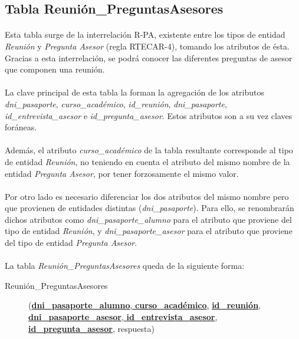   \subsection{Tabla Reunión\_PreguntasAsesores}

      \paragraph{}Esta tabla surge de la interrelación R-PA, existente entre
      los tipos de entidad \textit{Reunión} y \textit{Pregunta Asesor}
      (regla RTECAR-4), tomando los atributos de ésta. Gracias a esta
      interrelación, se podrá conocer las diferentes preguntas de asesor que
      componen una reunión.

      \paragraph{}La clave principal de esta tabla la forman la agregación de
      los atributos \textit{dni\_pasaporte}, \textit{curso\_académico},
      \textit{id\_reunión}, \textit{dni\_pasaporte},
      \textit{id\_entrevista\_asesor} e \textit{id\_pregunta\_asesor}. Estos
      atributos son a su vez claves foráneas.

      \paragraph{}Además, el atributo \textit{curso\_académico} de la tabla
      resultante corresponde al tipo de entidad \textit{Reunión}, no teniendo en
      cuenta el atributo del mismo nombre de la entidad
      \textit{Pregunta Asesor}, por tener forzosamente el mismo valor.

      \paragraph{}Por otro lado es necesario diferenciar los dos atributos del
      mismo nombre pero que provienen de entidades distintas
      (\textit{dni\_pasaporte}). Para ello, se renombrarán dichos atributos como
      \textit{dni\_pasaporte\_alumno} para el atributo que proviene del tipo de
      entidad \textit{Reunión}, y \textit{dni\_pasaporte\_asesor} para el
      atributo que proviene del tipo de entidad \textit{Pregunta Asesor}.

      \paragraph{}La tabla \textit{Reunión\_PreguntasAsesores} queda de la
      siguiente forma:

      \begin{description}
         \item[Reunión\_PreguntasAsesores] \begin{flushleft}(\underline{\textbf{dni\_pasaporte\_alumno}, \textbf{curso\_académico},}
         \underline{\textbf{id\_reunión}, \textbf{dni\_pasaporte\_asesor},
         \textbf{id\_entrevista\_asesor},} \underline{\textbf{id\_pregunta\_asesor}},
         respuesta)\end{flushleft}
      \end{description}